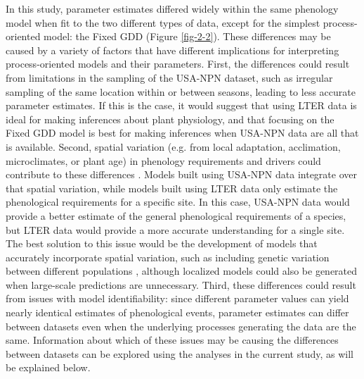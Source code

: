 In this study, parameter estimates differed widely within the same phenology model when fit to the two different types of data, except for the simplest process-oriented model: the Fixed GDD (Figure \ref{fig-2-2}). These differences may be caused by a variety of factors that have different implications for interpreting process-oriented models and their parameters. First, the differences could result from limitations in the sampling of the USA-NPN dataset, such as irregular sampling of the same location within or between seasons, leading to less accurate parameter estimates. If this is the case, it would suggest that using LTER data is ideal for making inferences about plant physiology, and that focusing on the Fixed GDD model is best for making inferences when USA-NPN data are all that is available. Second, spatial variation (e.g. from local adaptation, acclimation, microclimates, or plant age)  in phenology requirements and drivers could contribute to these differences \citep{diez2012, zhang2017}. Models built using USA-NPN data integrate over that spatial variation, while models built using LTER data only estimate the phenological requirements for a specific site. In this case, USA-NPN data would provide a better estimate of the general phenological requirements of a species, but LTER data would provide a more accurate understanding for a single site. The best solution to this issue would be the development of models that accurately incorporate spatial variation, such as including genetic variation between different populations \citep{chuine2017}, although localized models could also be generated when large-scale predictions are unnecessary. Third, these differences could result from issues with model identifiability: since different parameter values can yield nearly identical estimates of phenological events, parameter estimates can differ between datasets even when the underlying processes generating the data are the same. Information about which of these issues may be causing the differences between datasets can be explored using the analyses in the current study, as will be explained below.

